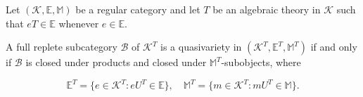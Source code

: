 Let $(\mathcal{K}, \mathbb{E}, \mathbb{M})$ be a regular category and let $T$ be an algebraic theory in $\mathcal{K}$ such that $eT \in \mathbb{E}$ whenever $e \in \mathbb{E}$.

A full replete subcategory $\mathcal{B}$ of $\mathcal{K}^T$ is a quasivariety in $(\mathcal{K}^T, \mathbb{E}^T, \mathbb{M}^T)$ if and only if $\mathcal{B}$ is closed under products and closed under $\mathbb{M}^T$-subobjects, where

$$\mathbb{E}^T = \{e \in \mathcal{K}^T : eU^T \in \mathbb{E}\}, \quad \mathbb{M}^T = \{m \in \mathcal{K}^T : mU^T \in \mathbb{M}\}.$$
